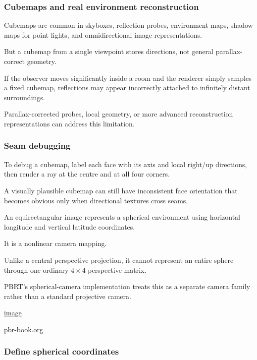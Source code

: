 \subsubsection{Cubemaps and real environment reconstruction}\label{cubemaps-and-real-environment-reconstruction}

Cubemaps are common in skyboxes, reflection probes, environment maps, shadow maps for point lights, and omnidirectional image representations.

But a cubemap from a single viewpoint stores directions, not general parallax-correct geometry.

If the observer moves significantly inside a room and the renderer simply samples a fixed cubemap, reflections may appear incorrectly attached to infinitely distant surroundings.

Parallax-corrected probes, local geometry, or more advanced reconstruction representations can address this limitation.

\subsubsection{Seam debugging}\label{seam-debugging}

To debug a cubemap, label each face with its axis and local right/up directions, then render a ray at the centre and at all four corners.

A visually plausible cubemap can still have inconsistent face orientation that becomes obvious only when directional textures cross seams.

An equirectangular image represents a spherical environment using horizontal longitude and vertical latitude coordinates.

It is a nonlinear camera mapping.

Unlike a central perspective projection, it cannot represent an entire sphere through one ordinary \(4\times4\) perspective matrix.

PBRT's spherical-camera implementation treats this as a separate camera family rather than a standard projective camera. 

\href{https://www.google.com/s2/favicons?domain=https://pbr-book.org&sz=32}{image}

pbr-book.org

\subsubsection{Define spherical coordinates}\label{define-spherical-coordinates}

